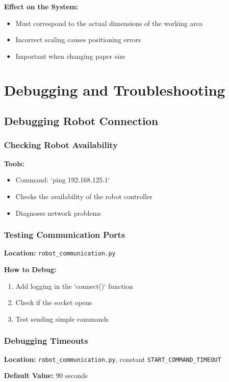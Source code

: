 \documentclass[a4paper,12pt]{article}
\begin{document}
\textbf{Effect on the System:}
\begin{itemize}
\item Must correspond to the actual dimensions of the working area
\item Incorrect scaling causes positioning errors
\item Important when changing paper size
\end{itemize}

\section{Debugging and Troubleshooting}

\subsection{Debugging Robot Connection}

\subsubsection{Checking Robot Availability}
\textbf{Tools:}
\begin{itemize}
\item Command: `ping 192.168.125.1`
\item Checks the availability of the robot controller
\item Diagnoses network problems
\end{itemize}

\subsubsection{Testing Communication Ports}
\textbf{Location:} \texttt{robot\_communication.py}

\textbf{How to Debug:}
\begin{enumerate}
\item Add logging in the `connect()` function
\item Check if the socket opens
\item Test sending simple commands
\end{enumerate}

\subsubsection{Debugging Timeouts}
\textbf{Location:} \texttt{robot\_communication.py}, constant \texttt{START\_COMMAND\_TIMEOUT}

\textbf{Default Value:} 90 seconds
\end{document}

